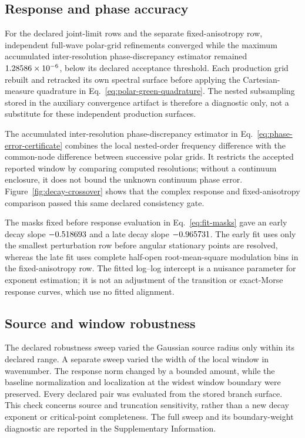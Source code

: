 \subsection{Response and phase accuracy}

For the declared joint-limit rows and the separate fixed-anisotropy row,
independent full-wave polar-grid refinements converged while the maximum
accumulated inter-resolution phase-discrepancy estimator remained
\(1.28586\times10^{-6}\), below its declared acceptance threshold.  Each production
grid rebuilt and retracked its own spectral surface
before applying the Cartesian-measure quadrature in
Eq.~\eqref{eq:polar-green-quadrature}.  The nested subsampling stored in the
auxiliary convergence artifact is therefore a diagnostic only, not a
substitute for these independent production surfaces.

The accumulated inter-resolution phase-discrepancy estimator in
Eq.~\eqref{eq:phase-error-certificate} combines the local nested-order
frequency difference with the common-node difference between successive polar
grids.  It restricts the accepted reported window by comparing computed
resolutions; without a continuum enclosure, it does not bound the unknown
continuum phase error.  Figure~\ref{fig:decay-crossover} shows that the complex
response and fixed-anisotropy comparison passed this same declared consistency
gate.

The masks fixed before response evaluation in Eq.~\eqref{eq:fit-masks} gave an
early decay slope
\(-0.518693\) and a late decay slope \(-0.965731\).  The early
fit uses only the smallest perturbation row before angular stationary points
are resolved, whereas the late fit uses complete half-open root-mean-square
modulation bins in the fixed-anisotropy row.  The fitted log--log intercept is
a nuisance parameter for exponent estimation; it is not an adjustment of the
transition or exact-Morse response curves, which use no fitted alignment.

\subsection{Source and window robustness}

The declared robustness sweep varied the Gaussian source radius only within
its declared range.  A separate sweep varied the width of the local window in
wavenumber.  The response norm changed by a bounded amount, while the baseline
normalization and localization at the widest window boundary were preserved.
Every declared pair was evaluated from the stored branch surface.  This check
concerns source and truncation sensitivity, rather than a new decay exponent or
critical-point completeness.  The full sweep and its boundary-weight
diagnostic are reported in the Supplementary Information.

